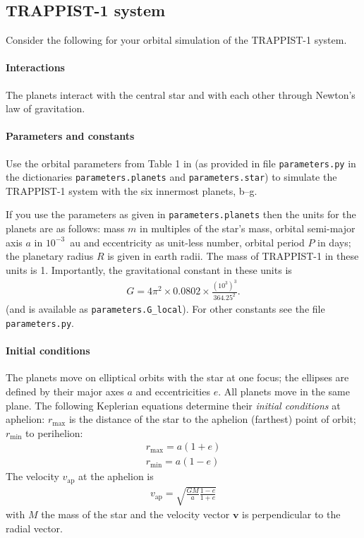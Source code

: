 \documentclass[letterpaper]{scrartcl}
\renewcommand{\vec}[1]{\ensuremath{\mathbf{#1}}}
\begin{document}
\subsection{TRAPPIST-1 system}
\label{sec:system}

Consider the following for your orbital simulation of the TRAPPIST-1 system.

\paragraph{Interactions}

The planets interact with the central star and with each other through
Newton's law of gravitation.

\paragraph{Parameters and constants}

Use the orbital parameters from Table 1 in \citet{Gillon:2017aa} (as
provided in file \texttt{parameters.py} in the dictionaries
\texttt{parameters.planets} and \texttt{parameters.star}) to simulate
the TRAPPIST-1 system with the six innermost planets, b--g.

If you use the parameters as given in \texttt{parameters.planets} then
the units for the planets are as follows: mass $m$ in multiples of the
star's mass, orbital semi-major axis $a$ in $10^{-3}$~au and
eccentricity as unit-less number, orbital period $P$ in days; the
planetary radius $R$ is given in earth radii. The mass of TRAPPIST-1
in these units is 1. Importantly, the gravitational constant in these
units is
\begin{gather}
  \label{eq:G}
  G = 4\pi^{2} \times 0.0802 \times \frac{(10^{3})^{3}}{364.25^{2}}.
\end{gather}
(and is available as \texttt{parameters.G\_local}). For other
constants see the file \texttt{parameters.py}.


\paragraph{Initial conditions}

The planets move on elliptical orbits with the star at one focus; the
ellipses are defined by their major axes $a$ and eccentricities
$e$. All planets move in the same plane. The following Keplerian
equations determine their \emph{initial conditions} at aphelion:
$r_\text{max}$ is the distance of the star to the aphelion (farthest)
point of orbit; $r_\text{min}$ to perihelion:
\begin{gather}
  r_\text{max} = a(1+e)\label{eq:aphelion}\\
  r_\text{min} = a(1-e)\label{eq:perihelion}
\end{gather}
The velocity $v_\text{ap}$ at the aphelion is
\begin{gather}
  \label{eq:vap}  
  v_\text{ap} = \sqrt{\frac{GM}{a} \frac{1-e}{1+e}}
\end{gather}
with $M$ the mass of the star and the velocity vector $\vec{v}$ is
perpendicular to the radial vector.
\end{document}
